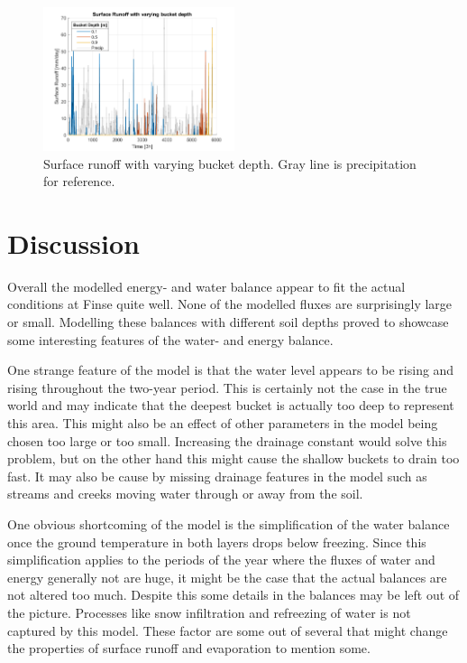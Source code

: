 \documentclass[a4paper,11pt,twocolumn]{article}
\begin{document}
\begin{figure}[h]
	\centering 
	\includegraphics[width=0.5\textwidth]{figures/runoff}
	\caption{Surface runoff with varying bucket depth. Gray line is precipitation for reference.}
	\label{fig:runoff}
\end{figure} 

\section{Discussion}

Overall the modelled energy- and water balance appear to fit the actual conditions at Finse quite well. None of the modelled fluxes are surprisingly large or small. Modelling these balances with different soil depths proved to showcase some interesting features of the water- and energy balance.  

One strange feature of the model is that the water level appears to be rising and rising throughout the two-year period. This is certainly not the case in the true world and may indicate that the deepest bucket is actually too deep to represent this area. This might also be an effect of other parameters in the model being chosen too large or too small. Increasing the drainage constant would solve this problem, but on the other hand this might cause the shallow buckets to drain too fast. It may also be cause by missing drainage features in the model such as streams and creeks moving water through or away from the soil. 

One obvious shortcoming of the model is the simplification of the water balance once the ground temperature in both layers drops below freezing. Since this simplification applies to the periods of the year where the fluxes of water and energy generally not are huge, it might be the case that the actual balances are not altered too much. Despite this some details in the balances may be left out of the picture. Processes like snow infiltration and refreezing of water is not captured by this model. These factor are some out of several that might change the properties of surface runoff and evaporation to mention some. 
\end{document}
